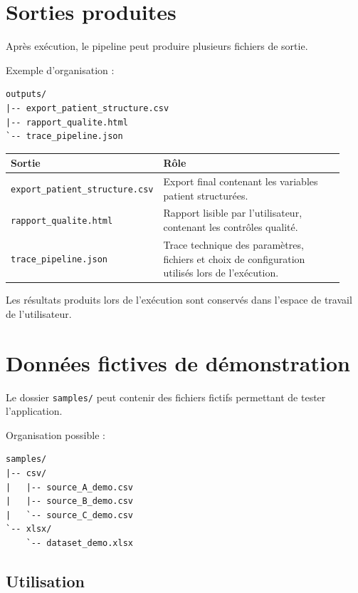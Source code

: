 \documentclass[11pt,a4paper]{article}
\newcommand{\code}[1]{\texttt{#1}}
\begin{document}
\section{Sorties produites}

Après exécution, le pipeline peut produire plusieurs fichiers de sortie.

Exemple d'organisation :

\begin{lstlisting}
outputs/
|-- export_patient_structure.csv
|-- rapport_qualite.html
`-- trace_pipeline.json
\end{lstlisting}

\begin{longtable}{p{0.30\linewidth} p{0.63\linewidth}}
\toprule
\textbf{Sortie} & \textbf{Rôle} \\
\midrule
\endhead

\code{export\_patient\_structure.csv} &
Export final contenant les variables patient structurées. \\

\code{rapport\_qualite.html} &
Rapport lisible par l'utilisateur, contenant les contrôles qualité. \\

\code{trace\_pipeline.json} &
Trace technique des paramètres, fichiers et choix de configuration utilisés lors de l'exécution. \\

\bottomrule
\end{longtable}

Les résultats produits lors de l'exécution sont conservés dans l'espace de travail de l'utilisateur.

\section{Données fictives de démonstration}

Le dossier \code{samples/} peut contenir des fichiers fictifs permettant de tester l'application.

Organisation possible :

\begin{lstlisting}
samples/
|-- csv/
|   |-- source_A_demo.csv
|   |-- source_B_demo.csv
|   `-- source_C_demo.csv
`-- xlsx/
    `-- dataset_demo.xlsx
\end{lstlisting}

\subsection{Utilisation}
\end{document}
